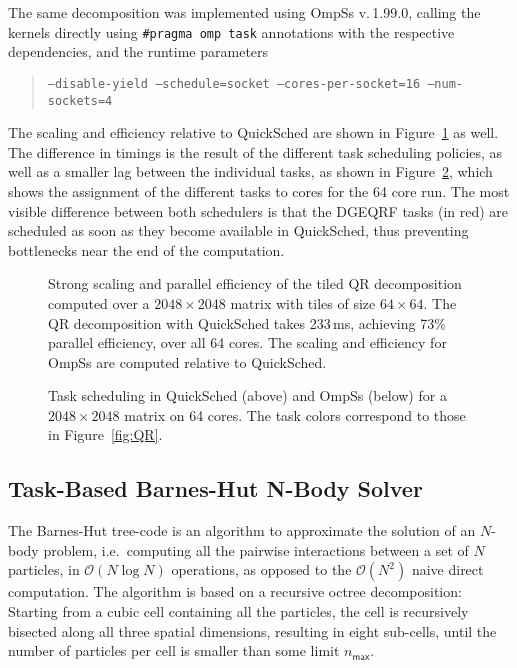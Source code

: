 \documentclass[preprint]{elsarticle}
\newcommand{\oh}[1]
    {\mbox{$ {\mathcal O}( #1 ) $}}
\newcommand{\fig}[1]
    {Figure~\ref{fig:#1}}
\begin{document}
The same decomposition was implemented using OmpSs v.\,1.99.0,
calling the kernels directly using {\tt \#pragma omp task}
annotations with the respective dependencies, and
the runtime parameters
\begin{quote}
    \tt --disable-yield --schedule=socket --cores-per-socket=16 --num-sockets=4
\end{quote}
\noindent The scaling and efficiency relative to QuickSched are 
shown in \fig{QRResults} as well.
The difference in timings is the result of the different
task scheduling policies, as well as a smaller lag between the
individual tasks, as shown in \fig{QRTasks},
which shows the assignment of the different tasks to cores for the
64 core run.
The most visible difference between both schedulers is that
the DGEQRF tasks (in red) are scheduled as soon as they
become available in QuickSched, thus preventing bottlenecks
near the end of the computation.

\begin{figure}
    \centerline{}
    \caption{Strong scaling and parallel efficiency of the tiled QR decomposition
        computed over a $2048\times 2048$ matrix with tiles of size
        $64\times 64$.
        The QR decomposition with QuickSched takes 233\,ms,
        achieving 73\% parallel efficiency, over all 64 cores.
        The scaling and efficiency for OmpSs are computed relative to QuickSched.
        }
    \label{fig:QRResults}
\end{figure}

\begin{figure}
    \centerline{}
    \centerline{}
    \caption{Task scheduling in QuickSched (above) and OmpSs (below)
        for a $2048\times 2048$ matrix on 64 cores.
        The task colors correspond to those in \fig{QR}.}
    \label{fig:QRTasks}
\end{figure}


\subsection{Task-Based Barnes-Hut N-Body Solver}

The Barnes-Hut tree-code is an algorithm to approximate the
solution of an $N$-body problem, i.e.~computing all the
pairwise interactions between a set of $N$ particles,
in \oh{N\log N} operations, as opposed to the \oh{N^2}
naive direct computation.
The algorithm is based on a recursive octree decomposition:
Starting from a cubic cell containing all the particles,
the cell is recursively bisected along all three spatial dimensions,
resulting in eight sub-cells, until the number of particles
per cell is smaller than some limit $n_\mathsf{max}$.
\end{document}
